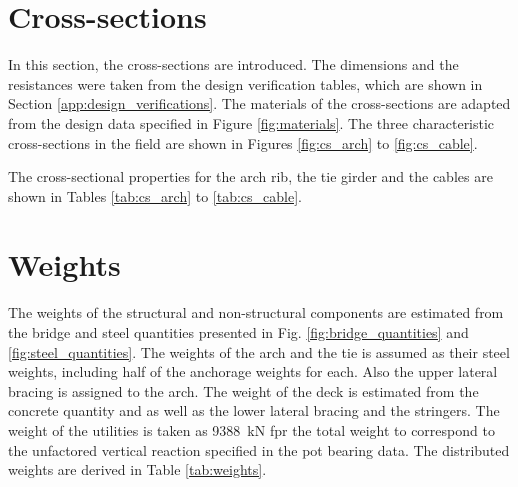 \section{Cross-sections} \label{app:cross_sections}
In this section, the cross-sections are introduced. The dimensions and the resistances were taken from the design verification tables, which are shown in Section \ref{app:design_verifications}. The materials of the cross-sections are adapted from the design data specified in Figure \ref{fig:materials}. The three characteristic cross-sections in the field are shown in Figures \ref{fig:cs_arch} to \ref{fig:cs_cable}. 

The cross-sectional properties for the arch rib, the tie girder and the cables are shown in Tables \ref{tab:cs_arch} to \ref{tab:cs_cable}.





\newpage
\section{Weights} \label{app:weight}
The weights of the structural and non-structural components are estimated from the bridge and steel quantities presented in Fig. \ref{fig:bridge_quantities} and \ref{fig:steel_quantities}. The weights of the arch and the tie is assumed as their steel weights, including half of the anchorage weights for each. Also the upper lateral bracing is assigned to the arch. The weight of the deck is estimated from the concrete quantity and as well as the lower lateral bracing and the stringers. The weight of the utilities is taken as \SI{9388}{kN} fpr the total weight to correspond to the unfactored vertical reaction specified in the pot bearing data. The distributed weights are derived in Table  \ref{tab:weights}.

